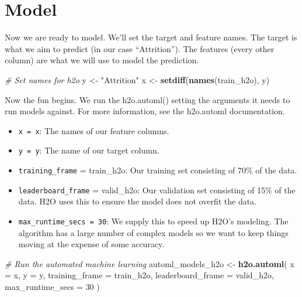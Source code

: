 \documentclass[]{book}
\newenvironment{Shaded}{\begin{snugshade}}{\end{snugshade}}
\newcommand{\CommentTok}[1]{\textcolor[rgb]{0.56,0.35,0.01}{\textit{#1}}}
\newcommand{\DataTypeTok}[1]{\textcolor[rgb]{0.13,0.29,0.53}{#1}}
\newcommand{\DecValTok}[1]{\textcolor[rgb]{0.00,0.00,0.81}{#1}}
\newcommand{\KeywordTok}[1]{\textcolor[rgb]{0.13,0.29,0.53}{\textbf{#1}}}
\newcommand{\NormalTok}[1]{#1}
\newcommand{\StringTok}[1]{\textcolor[rgb]{0.31,0.60,0.02}{#1}}
\providecommand{\tightlist}{%
  \setlength{\itemsep}{0pt}\setlength{\parskip}{0pt}}
\begin{document}
\hypertarget{model}{%
\section{Model}\label{model}}

Now we are ready to model. We'll set the target and feature names. The target is what we aim to predict (in our case ``Attrition''). The features (every other column) are what we will use to model the prediction.

\begin{Shaded}
\begin{Highlighting}[]
\CommentTok{# Set names for h2o}
\NormalTok{y <-}\StringTok{ "Attrition"}
\NormalTok{x <-}\StringTok{ }\KeywordTok{setdiff}\NormalTok{(}\KeywordTok{names}\NormalTok{(train_h2o), y)}
\end{Highlighting}
\end{Shaded}

Now the fun begins. We run the h2o.automl() setting the arguments it needs to run models against. For more information, see the h2o.automl documentation.

\begin{itemize}
\tightlist
\item
  \texttt{x\ =\ x}: The names of our feature columns.
\item
  \texttt{y\ =\ y}: The name of our target column.
\item
  \texttt{training\_frame} = train\_h2o: Our training set consisting of 70\% of the data.
\item
  \texttt{leaderboard\_frame} = valid\_h2o: Our validation set consisting of 15\% of the data. H2O uses this to ensure the model does not overfit the data.
\item
  \texttt{max\_runtime\_secs\ =\ 30}: We supply this to speed up H2O's modeling. The algorithm has a large number of complex models so we want to keep things moving at the expense of some accuracy.
\end{itemize}

\begin{Shaded}
\begin{Highlighting}[]
\CommentTok{# Run the automated machine learning }
\NormalTok{automl_models_h2o <-}\StringTok{ }\KeywordTok{h2o.automl}\NormalTok{(}
    \DataTypeTok{x =}\NormalTok{ x, }
    \DataTypeTok{y =}\NormalTok{ y,}
    \DataTypeTok{training_frame    =}\NormalTok{ train_h2o,}
    \DataTypeTok{leaderboard_frame =}\NormalTok{ valid_h2o,}
    \DataTypeTok{max_runtime_secs  =} \DecValTok{30}
\NormalTok{    )}
\end{Highlighting}
\end{Shaded}
\end{document}
